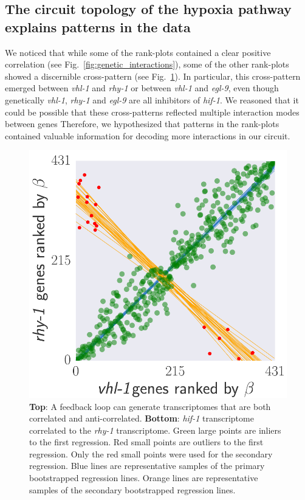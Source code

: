\documentclass[9pt,twocolumn,twoside]{pnas-new}
\newcommand{\egl}{\emph{egl-9}}
\newcommand{\rhy}{\emph{rhy-1}}
\newcommand{\vhl}{\emph{vhl-1}}
\newcommand{\hif}{\emph{hif-1}}
\begin{document}
\subsection*{The circuit topology of the hypoxia pathway explains patterns in
            the data}
\label{sub:topology}
We noticed that while some of the rank-plots contained a clear positive correlation
(see Fig.~\ref{fig:genetic_interactions}), some of the other rank-plots showed
a discernible cross-pattern (see Fig.~\ref{fig:xpattern}). In particular, this
cross-pattern emerged between \vhl{} and \rhy{} or between \vhl{} and \egl{},
even though genetically \vhl{}, \rhy{} and \egl{} are all inhibitors of \hif{}.
We reasoned that it could be possible that these cross-patterns reflected multiple
interaction modes between genes
Therefore, we hypothesized that patterns in the rank-plots contained
valuable information for decoding more interactions in our circuit.

\begin{figure}[tbhp]
\centering
\includegraphics[width=\linewidth]{figs/correlative_genetics2.pdf}
\caption{
\textbf{Top}: A feedback loop can generate transcriptomes that are both
correlated and anti-correlated. \textbf{Bottom}: \hif{} transcriptome correlated
to the \rhy{} transcriptome. Green large points are inliers to the first
regression. Red small points are outliers to the first regression. Only the red
small points were used for the secondary regression. Blue lines are representative
samples of the primary bootstrapped regression lines. Orange lines are
representative samples of the secondary bootstrapped regression lines.
}
\label{fig:xpattern}
\end{figure}
\end{document}
